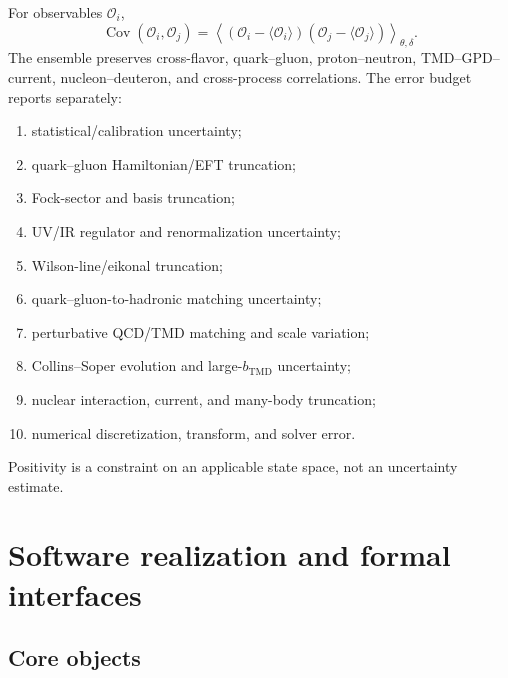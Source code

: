 \documentclass[11pt]{article}
\newcommand{\cO}{\mathcal O}
\begin{document}
For observables \(\cO_i\),
\begin{equation}
 \operatorname{Cov}(\cO_i,\cO_j)
 =\left\langle
 (\cO_i-\langle\cO_i\rangle)
 (\cO_j-\langle\cO_j\rangle)
 \right\rangle_{\theta,\delta}.
\label{eq:observable-covariance}
\end{equation}
The ensemble preserves cross-flavor, quark--gluon, proton--neutron,
TMD--GPD--current, nucleon--deuteron, and cross-process correlations.
The error budget reports separately:
\begin{enumerate}
\item statistical/calibration uncertainty;
\item quark--gluon Hamiltonian/EFT truncation;
\item Fock-sector and basis truncation;
\item UV/IR regulator and renormalization uncertainty;
\item Wilson-line/eikonal truncation;
\item quark--gluon-to-hadronic matching uncertainty;
\item perturbative QCD/TMD matching and scale variation;
\item Collins--Soper evolution and large-\(b_{\mathrm{TMD}}\) uncertainty;
\item nuclear interaction, current, and many-body truncation;
\item numerical discretization, transform, and solver error.
\end{enumerate}
Positivity is a constraint on an applicable state space, not an uncertainty
estimate.

\section{Software realization and formal interfaces}
\label{sec:software}

\subsection{Core objects}
\end{document}
